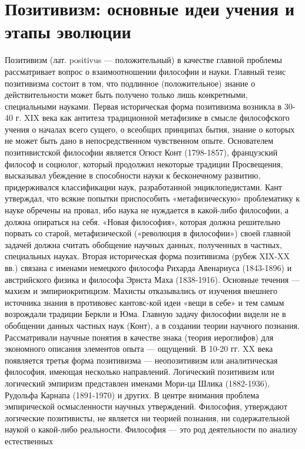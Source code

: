 \documentclass[12pt]{article}
\begin{document}
\section{Позитивизм: основные идеи учения и этапы эволюции}
Позитивизм  (лат.  positivus  —  положительный)  в  качестве  главной  проблемы  рассматривает  вопрос  о
взаимоотношении  философии  и  науки.  Главный  тезис  позитивизма  состоит  в  том,  что  подлинное
(положительное) знание о действительности может быть получено только лишь конкретными, специальными
науками.
Первая историческая форма позитивизма возникла в 30-40 г. XIX века как антитеза традиционной метафизике в
смысле философского учения о началах всего сущего, о всеобщих принципах бытия, знание о которых не может
быть дано в непосредственном чувственном опыте. Основателем позитивистской философии является Огюст
Конт (1798-1857), французский философ и социолог, который продолжил некоторые традиции Просвещения,
высказывал убеждение в способности науки к бесконечному развитию, придерживался классификации наук,
разработанной энциклопедистами.
Кант утверждал, что всякие попытки приспособить «метафизическую» проблематику к науке обречены на
провал, ибо наука не нуждается в какой-либо философии, а должна опираться на себя. «Новая философия»,
которая должна решительно порвать со старой, метафизической («революция в философии») своей главной
задачей должна считать обобщение научных данных, полученных в частных, специальных науках.
Вторая историческая форма позитивизма (рубеж XIX-XX вв.) связана с именами немецкого философа Рихарда
Авенариуса (1843-1896) и австрийского физика и философа Эрнста Маха (1838-1916). Основные течения —
махизм и эмпириокритицизм. Махисты отказывались от изучения внешнего источника знания в противовес
кантовс-кой идеи «вещи в себе» и тем самым возрождали традиции Беркли и Юма. Главную задачу философии
видели не в обобщении данных частных наук (Конт), а в создании теории научного познания. Рассматривали
научные  понятия  в  качестве  знака  (теория  иероглифов)  для  экономного  описания  элементов  опыта  —
ощущений.
В 10-20 гг. XX века появляется третья форма позитивизма — неопозитивизм или аналитическая философия,
имеющая несколько направлений.
Логический позитивизм или логический эмпиризм представлен именами Мори-ца Шлика (1882-1936), Рудольфа
Карнапа  (1891-1970)  и  других.  В  центре  внимания  проблема  эмпирической  осмысленности  научных
утверждений.  Философия,  утверждают  логические  позитивисты,  не  является  ни  теорией  познания,  ни
содержательной наукой о какой-либо реальности. Философия — это род деятельности по анализу естественных
\end{document}
